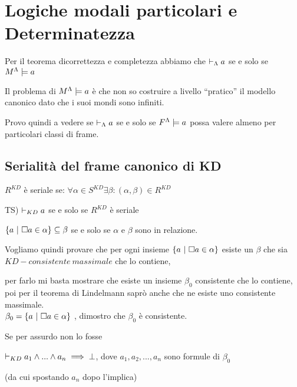 
\chapter{Logiche modali particolari e Determinatezza}

Per il teorema dicorrettezza e completezza abbiamo che $\vdash_{\Lambda}a$
se e solo se $M^{\Lambda}\models a$

Il problema di $M^{\Lambda}\models a$ è che non so costruire a livello
``pratico'' il modello canonico dato che i suoi mondi sono infiniti.

Provo quindi a vedere se $\vdash_{\Lambda}a$ se e solo se $F^{\Lambda}\models a$
possa valere almeno per particolari classi di frame.



\section{Serialità del frame canonico di KD}

$R^{KD}$ è seriale se: $\forall\alpha\in S^{KD}\exists\beta:(\alpha,\beta)\in R^{KD}$

TS) $\vdash_{KD}a$ se e solo se $R^{KD}$ è seriale



$\{a\ |\ \square a\in\alpha\}\subseteq\beta$ se e solo se $\alpha$ e $\beta$ sono
in relazione.

Vogliamo quindi provare che per ogni insieme $\{a\ |\ \square a\in\alpha\}$
esiste un $\beta$ che sia $KD-consistente\ massimale$ che lo contiene,

per farlo mi basta mostrare che esiste un insieme $\beta_{0}$ consistente
che lo contiene, poi per il teorema di Lindelmann saprò anche che
ne esiste uno consistente massimale.\\


$\beta_{0}=\{a\ |\ \square a\in\alpha\}$ , dimostro che $\beta_{0}$ è
consistente.

Se per assurdo non lo fosse

$\vdash_{KD}a_{1}\wedge...\wedge a_{n}\implies\bot$, dove $a_{1},a_{2},...,a_{n}$
sono formule di $\beta_{0}$

(da cui spostando $a_{n}$ dopo l'implica)

